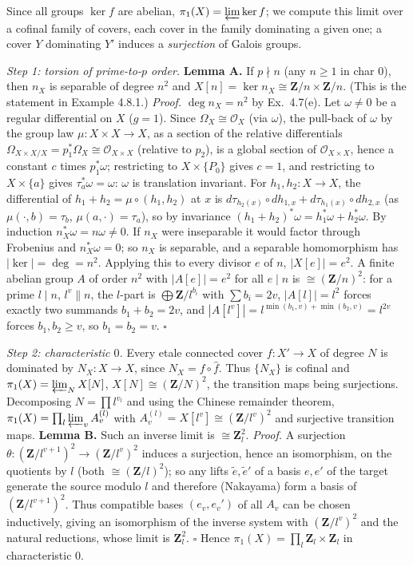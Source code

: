 \documentclass[11pt]{article}
\begin{document}
Since all groups $\ker f$ are abelian, $\pi_1(X)=\varprojlim\ker f$; we compute this limit over a cofinal family of covers, each cover in the family dominating a given one; a cover $Y$ dominating $Y'$ induces a \emph{surjection} of Galois groups.

\emph{Step 1: torsion of prime-to-$p$ order.} \textbf{Lemma A.} If $p\nmid n$ (any $n\ge1$ in char $0$), then $n_X$ is separable of degree $n^2$ and $X[n]=\ker n_X\cong\mathbf Z/n\times\mathbf Z/n$. (This is the statement in Example 4.8.1.)
\emph{Proof.} $\deg n_X=n^2$ by Ex.~4.7(e). Let $\omega\ne0$ be a regular differential on $X$ ($g=1$). Since $\Omega_X\cong\mathcal O_X$ (via $\omega$), the pull-back of $\omega$ by the group law $\mu:X\times X\to X$, as a section of the relative differentials $\Omega_{X\times X/X}=p_1^*\Omega_X\cong\mathcal O_{X\times X}$ (relative to $p_2$), is a global section of $\mathcal O_{X\times X}$, hence a constant $c$ times $p_1^*\omega$; restricting to $X\times\{P_0\}$ gives $c=1$, and restricting to $X\times\{a\}$ gives $\tau_a^*\omega=\omega$: $\omega$ is translation invariant. For $h_1,h_2:X\to X$, the differential of $h_1+h_2=\mu\circ(h_1,h_2)$ at $x$ is $d\tau_{h_2(x)}\circ dh_{1,x}+d\tau_{h_1(x)}\circ dh_{2,x}$ (as $\mu(\cdot,b)=\tau_b$, $\mu(a,\cdot)=\tau_a$), so by invariance $(h_1+h_2)^*\omega=h_1^*\omega+h_2^*\omega$. By induction $n_X^*\omega=n\omega\ne0$. If $n_X$ were inseparable it would factor through Frobenius and $n_X^*\omega=0$; so $n_X$ is separable, and a separable homomorphism has $|\ker|=\deg=n^2$. Applying this to every divisor $e$ of $n$, $|X[e]|=e^2$. A finite abelian group $A$ of order $n^2$ with $|A[e]|=e^2$ for all $e\mid n$ is $\cong(\mathbf Z/n)^2$: for a prime $l\mid n$, $l^v\|n$, the $l$-part is $\bigoplus\mathbf Z/l^{b_i}$ with $\sum b_i=2v$, $|A[l]|=l^2$ forces exactly two summands $b_1+b_2=2v$, and $|A[l^v]|=l^{\min(b_1,v)+\min(b_2,v)}=l^{2v}$ forces $b_1,b_2\ge v$, so $b_1=b_2=v$. \hfill$\square$

\emph{Step 2: characteristic $0$.} Every etale connected cover $f:X'\to X$ of degree $N$ is dominated by $N_X:X\to X$, since $N_X=f\circ\hat f$. Thus $\{N_X\}$ is cofinal and $\pi_1(X)=\varprojlim_NX[N]$, $X[N]\cong(\mathbf Z/N)^2$, the transition maps being surjections. Decomposing $N=\prod l^{v_l}$ and using the Chinese remainder theorem, $\pi_1(X)=\prod_l\varprojlim_v A_v^{(l)}$ with $A_v^{(l)}=X[l^v]\cong(\mathbf Z/l^v)^2$ and surjective transition maps. \textbf{Lemma B.} Such an inverse limit is $\cong\mathbf Z_l^2$. \emph{Proof.} A surjection $\theta:(\mathbf Z/l^{v+1})^2\to(\mathbf Z/l^v)^2$ induces a surjection, hence an isomorphism, on the quotients by $l$ (both $\cong(\mathbf Z/l)^2$); so any lifts $\tilde e,\tilde e'$ of a basis $e,e'$ of the target generate the source modulo $l$ and therefore (Nakayama) form a basis of $(\mathbf Z/l^{v+1})^2$. Thus compatible bases $(e_v,e_v')$ of all $A_v$ can be chosen inductively, giving an isomorphism of the inverse system with $(\mathbf Z/l^v)^2$ and the natural reductions, whose limit is $\mathbf Z_l^2$. \hfill$\square$
Hence $\pi_1(X)=\prod_l\mathbf Z_l\times\mathbf Z_l$ in characteristic $0$.
\end{document}
